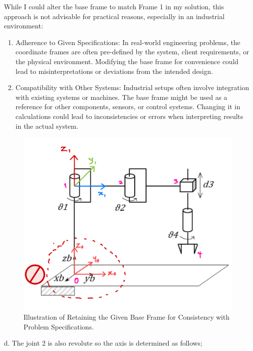 \documentclass[12pt]{report}
\begin{document}
While I could alter the base frame to match Frame 1 in my solution, this approach is not advisable for practical reasons, especially in an industrial environment:
\begin{enumerate}[label=\roman*.]
	\item Adherence to Given Specifications:
	In real-world engineering problems, the coordinate frames are often pre-defined by the system, client requirements, or the physical environment. Modifying the base frame for convenience could lead to misinterpretations or deviations from the intended design.
	\item Compatibility with Other Systems:
	Industrial setups often involve integration with existing systems or machines. The base frame might be used as a reference for other components, sensors, or control systems. Changing it in calculations could lead to inconsistencies or errors when interpreting results in the actual system.
	
\end{enumerate}
\begin{figure}[H]
	\centering
	\includegraphics[scale=0.3]{3} %
	\caption{Illustration of Retaining the Given Base Frame for Consistency with Problem Specifications.}
	\label{fig:retain} %
\end{figure}


d. The joint 2 is also revolute so the axis is determined as follows;
\end{document}
